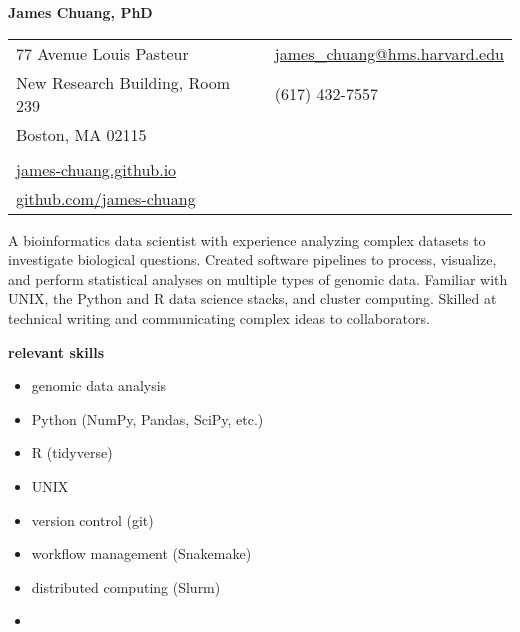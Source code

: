 \documentclass[11pt, a4paper]{article}
\begin{document}
\textbf{\LARGE James Chuang, PhD}

\vspace{0.6cm}

\begin{tabularx}{13 cm}{@{}Xl}
    77 Avenue Louis Pasteur & \href{mailto:james_chuang@hms.harvard.edu}{james\_chuang@hms.harvard.edu} \\
    New Research Building, Room 239 & (617) 432-7557                                                     \\
    Boston, MA 02115        &                                                                           \\
    \\
    \href{https://james-chuang.github.io}{james-chuang.github.io} \\
    \href{https://github.com/james-chuang}{github.com/james-chuang} \\
\end{tabularx}

\vspace{1em}
\noindent\hrulefill
\vspace{1em}

A bioinformatics data scientist with experience analyzing complex datasets to investigate biological questions.
Created software pipelines to process, visualize, and perform statistical analyses on multiple types of genomic data.
Familiar with UNIX, the Python and R data science stacks, and cluster computing.
Skilled at technical writing and communicating complex ideas to collaborators.

\vspace{1em}
\textbf{\Large relevant skills}

\setlength{\columnsep}{-1.25cm}
\begin{multicols}{2}
    \begin{itemize}[topsep=0pt,itemsep=-3pt]
        \item genomic data analysis
        \item Python (NumPy, Pandas, SciPy, etc.)
        \item R (tidyverse)
        \item UNIX
        \item version control (git)
        \item workflow management (Snakemake)
        \item distributed computing (Slurm)
        \item[]
    \end{itemize}
\end{multicols}
\end{document}
